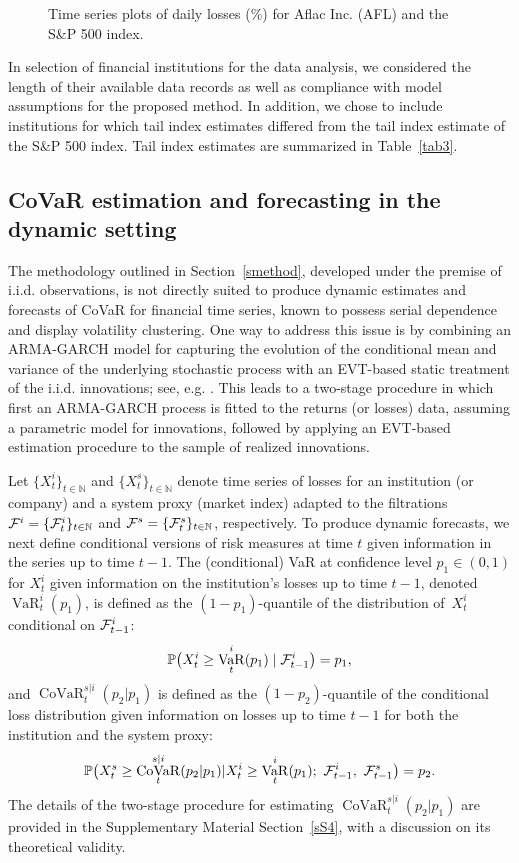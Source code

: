 \documentclass[11pt,letterpaper]{article}
\def\FC{{\cal F}}
\DeclareMathOperator{\VaR}{VaR}
\DeclareMathOperator{\CoVaR}{CoVaR}
\def\nbb{{\mathbb N}}
\def\pbb{{\mathbb P}}
\numberwithin{equation}{section}
\begin{document}
\begin{figure}[ht]
  \centering 
      \caption{Time series plots of daily losses (\%) for Aflac Inc. (AFL) and the S\&P 500 index.}
  \label{fig:time series}
\end{figure}

In selection of financial institutions for the data analysis, we considered the length of their available data records as well as compliance with model assumptions for the proposed method. In addition, we chose to include institutions for which tail index estimates differed from the tail index estimate of the S\&P 500 index. Tail index estimates are summarized in Table~\ref{tab3}.


\subsection{CoVaR estimation and forecasting in the dynamic setting}\label{sappl2}

The methodology outlined in Section~\ref{smethod}, developed under the premise of i.i.d. observations, is not directly suited to produce dynamic estimates and forecasts of CoVaR for financial time series, known to possess serial dependence and display volatility clustering. One way to address this issue is by combining an ARMA-GARCH model for capturing the evolution of the conditional mean and variance of the underlying stochastic process with an EVT-based static treatment of the i.i.d. innovations; see, e.g. \cite{McNeilFrey2000}. This leads to a two-stage procedure in which first an ARMA-GARCH process is fitted to the returns (or losses) data, assuming a parametric model for innovations, followed by applying an EVT-based estimation procedure to the sample of realized innovations. 


Let $\{X_t^i\}_{t\in \nbb}$ and $\{X_t^s\}_{t\in \nbb}$ denote time series of losses for an institution (or company) and a system proxy (market index) adapted to the filtrations $\FC^i=\{\FC_t^i\}_{t\in \nbb}$ and $\FC^s=\{\FC_t^s\}_{t\in \nbb}$, respectively. To produce dynamic forecasts, we next define conditional versions of risk measures at time $t$ given information in the series up to time $t-1$.
The (conditional) VaR at confidence level $p_1\in (0,1)$ for $X_t^i$ given information on the institution's losses up to time $t-1$, denoted $\VaR^i_{t}(p_1)$,  is defined as the $(1-p_1)$-quantile of the distribution of~$X_t^i$ conditional on $\FC_{t-1}^i$:
$$\pbb\bigl(X_t^i\geq \VaR^i_{t}(p_1)\mid \FC_{t-1}^i \bigr) = p_1,$$
and $\CoVaR_{t}^{s|i}(p_2|p_1)$ is defined as the $(1-p_2)$-quantile of the conditional loss distribution given information on losses up to time $t-1$ for both the institution and the system proxy:
\begin{equation}
\label{dynamic_CoVaR}
    \pbb\bigl(X_t^s \geq \CoVaR_{t}^{s|i}(p_2|p_1) | X_t^i\geq \VaR^i_{t}(p_1);\ \FC_{t-1}^i,\   \FC_{t-1}^s\bigr) = p_2.
\end{equation}
The details of the two-stage procedure for estimating $\CoVaR_{t}^{s|i}(p_2|p_1)$ are provided in the Supplementary Material Section~\ref{sS4}, with a discussion on its theoretical validity.
\end{document}
